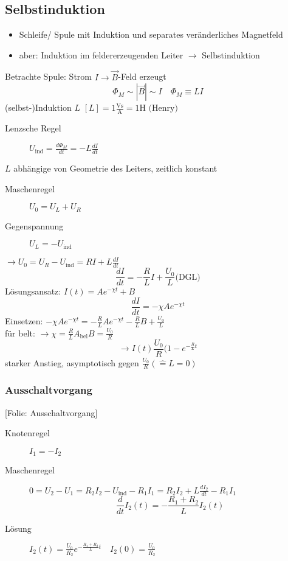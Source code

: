 \documentclass[titlepage,12pt,a4paper,ngerman]{report}
\newcommand{\tx}[1]{\textrm{#1}}
\newcommand{\uind}{U_{\tx{ind}}}
\newcommand{\folie}[1]{\color{gray}[Folie: #1]\color{black}}
\begin{document}

\subsection{Selbstinduktion}
\begin{itemize}
	\item Schleife/ Spule mit Induktion und separates veränderliches Magnetfeld
	\item aber: Induktion im feldererzeugenden Leiter $\rightarrow$ Selbstinduktion
\end{itemize}
Betrachte Spule: Strom $I \rightarrow \vec{B}$-Feld erzeugt
$$\Phi_M \sim |\vec{B}| \sim I \quad \Phi_M \equiv LI$$
(selbst-)Induktion $L$ $[L] = 1\frac{\tx{Vs}}{\tx{A}} = 1 \tx{H (Henry)}$
\begin{description}
	\item [Lenzsche Regel] $U_{\tx{ind}} = \frac{d \Phi_M}{dt} = - L \frac{dI}{dt}$
\end{description}
$L$ abhängige von Geometrie des Leiters, zeitlich konstant
\begin{description}
	\item [Maschenregel] $U_0 = U_L + U_R$
	\item [Gegenspannung] $U_L = - \uind $
\end{description}
$\rightarrow U_0 = U_R - \uind = RI + L \frac{dI}{dt}$
$$\frac{dI}{dt}= - \frac{R}{L} I + \frac{U_0}{L} \tx{(DGL)}$$
Lösungsansatz: $I(t) = Ae^{-\chi t} + B$
$$\frac{dI}{dt} = -\chi Ae^{-\chi t}$$
Einsetzen: $- \chi A e^{-\chi t} = - \frac{R}{L} A e^{-\chi t} - \frac{R}{L}B + \frac{U_0}{L}$\\
für belt: $\rightarrow \chi = \frac{R}{L} A_{\tx{bel}} B = \frac{U_0}{R}$
$$\rightarrow I(t) \frac{U_0}{R} (1-e^{-\frac{R}{L} t}$$
starker Anstieg, asymptotisch gegen $\frac{U_0}{R} (\hat{=} L = 0)$

\subsubsection{Ausschaltvorgang}
\folie{Ausschaltvorgang}
\begin{description}
	\item [Knotenregel] $I_1 = -I_2$
	\item [Maschenregel] $0 = U_2 - U_1 = R_2 I_2 - \uind - R_1 I_1 = R_2 I_2 + L \frac{dI_2}{dt} - R_1 I_1$
	$$\frac{d}{dt} I_2 (t) = - \frac{R_1 + R_2}{L} I_2 (t)$$
	\item [Lösung] $I_2 (t) = \frac{U_0}{R_2} e^{-\frac{R_1 +R_2}{L} t} \quad I_2(0) = \frac{U_0}{R_2}$
\end{description}
\end{document}
